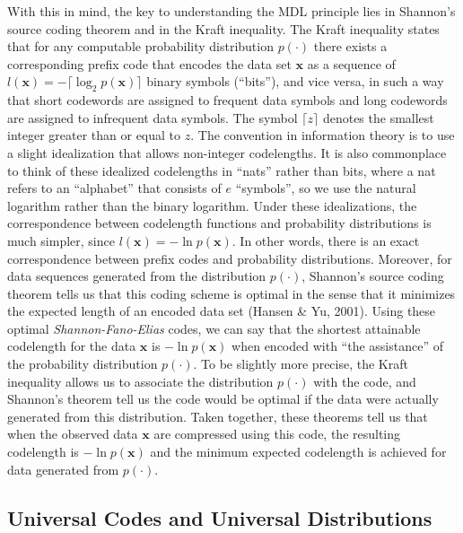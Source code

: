 \documentclass{elsart}
\begin{document}
With this in mind, the key to understanding the MDL principle lies in Shannon's source coding
theorem and in the Kraft inequality. The Kraft inequality states that for any computable
probability distribution $p(\cdot)$ there exists a corresponding prefix code that encodes the data
set $\bm x$  as a sequence of $l(\bm x) =-\! \lceil \log_2 p(\bm x) \rceil$ binary symbols
(``bits''), and vice versa, in such a way that short codewords are assigned to frequent data
symbols and long codewords are assigned to infrequent data symbols. The symbol $\lceil z \rceil$
denotes the smallest integer greater than or equal to $z$. The convention in information theory is
to use a slight idealization that allows non-integer codelengths. It is also commonplace to think
of these idealized codelengths in ``nats'' rather than bits, where a nat refers to an ``alphabet''
that consists of $e$ ``symbols'', so we use the natural logarithm rather than the binary
logarithm. Under these idealizations, the correspondence between codelength functions and
probability distributions is much simpler, since $l(\bm x) =-\! \ln p(\bm x)$. In other words,
there is an exact correspondence between prefix codes and probability distributions. Moreover, for
data sequences generated from the distribution $p(\cdot)$, Shannon's source coding theorem tells
us that this coding scheme is optimal in the sense that it minimizes the expected length of an
encoded data set (Hansen \& Yu, 2001). Using these optimal \emph{Shannon-Fano-Elias} codes,  we
can say that the shortest attainable codelength for the data $\bm x$ is $-\!\ln p(\bm x)$ when
encoded with ``the assistance'' of the probability distribution $p(\cdot)$. To be slightly more
precise, the Kraft inequality allows us to associate the distribution $p(\cdot)$ with the code,
and Shannon's theorem tell us the code would be optimal if the data were actually generated from
this distribution. Taken together, these theorems tell us that when the observed data $\bm x$ are
compressed using this code, the resulting codelength is $-\!\ln p(\bm x)$ and the minimum expected
codelength is achieved for data generated from $p(\cdot)$.

\subsection{Universal Codes and Universal Distributions}
\end{document}
